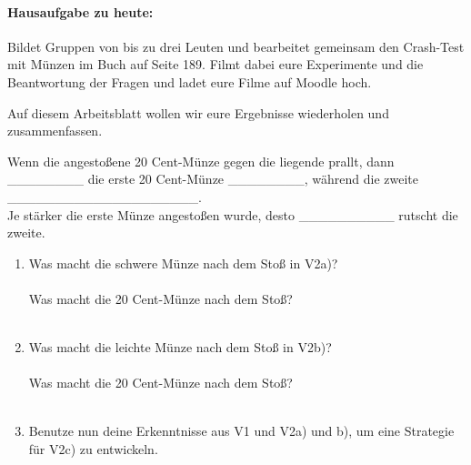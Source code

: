 \documentclass[task=1]{exercise}
\begin{document}
\paragraph{Hausaufgabe zu heute:} Bildet Gruppen von bis zu drei Leuten und bearbeitet gemeinsam den Crash-Test mit M\"unzen im Buch auf Seite 189. Filmt dabei eure Experimente und die Beantwortung der Fragen und ladet eure Filme auf Moodle hoch.

Auf diesem Arbeitsblatt wollen wir eure Ergebnisse wiederholen und zusammenfassen.

  \task[Beobachtung zu V1]
  Wenn die angesto{\ss}ene 20 Cent-M\"unze gegen die liegende prallt, dann \_\_\_\_\_\_\_\_ die erste 20 Cent-M\"unze \_\_\_\_\_\_\_\_, w\"ahrend die zweite \_\_\_\_\_\_\_\_\_\_\_\_\_\_\_\_\_\_\_\_.\\
  Je st\"arker die erste M\"unze angesto{\ss}en wurde, desto \_\_\_\_\_\_\_\_\_\_ rutscht die zweite.
  
  \task[Beobachtung zu V2]
  
  \begin{enumerate}[label=\textnormal{\roman*)}]
   \item Was macht die schwere M\"unze nach dem Sto{\ss} in V2a)?\\\vspace{1cm}\\
   Was macht die 20 Cent-M\"unze nach dem Sto{\ss}?\\\vspace{1cm}\\
   \item Was macht die leichte M\"unze nach dem Sto{\ss} in V2b)?\\\vspace{1cm}\\
   Was macht die 20 Cent-M\"unze nach dem Sto{\ss}?\\\vspace{1cm}\\
   \item Benutze nun deine Erkenntnisse aus V1 und V2a) und b), um eine Strategie f\"ur V2c) zu entwickeln.\\
   \vspace{3cm}
   \end{enumerate}
   
\end{document}
